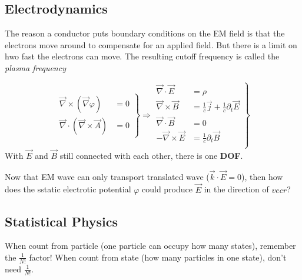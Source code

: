\subsection{Electrodynamics}

The reason a conductor puts boundary conditions on the EM field is that the
electrons move around to compensate for an applied field. But there is a
limit on hwo fast the electrons can move. The resulting cutoff frequency is
called the \textit{plasma frequency}
\begin{description}[style=nextline]
    \item [Maxwell Eqn] 
	\begin{equation}
	    \left.
	    \begin{aligned}
		\overrightarrow{\nabla} \times (\overrightarrow{\nabla} \varphi) &= 0 \\
		\overrightarrow{\nabla} \cdot (\overrightarrow{\nabla} \times \overrightarrow{A}) &= 0
	    \end{aligned}
	    \right\} 
	    \Rightarrow 
	    \left.
	    \begin{aligned}
		\overrightarrow{\nabla} \cdot \overrightarrow{E} &= \rho \\
		\overrightarrow{\nabla} \times \overrightarrow{B} &=
		\frac{1}{c} \overrightarrow{j} + \frac{1}{c}\partial_{t}\overrightarrow{E}   \\
		\overrightarrow{\nabla} \cdot \overrightarrow{B} &= 0	\\
		-\overrightarrow{\nabla} \times \overrightarrow{E} &=
		\frac{1}{c} \partial_{t}\overrightarrow{B}   \\
	    \end{aligned}
	    \right\}	
	\end{equation}
	With $\overrightarrow{E}$ and $\overrightarrow{B}$ still connected
	with each other, there is one \textbf{DOF}.
\end{description}

Now that EM wave can only transport translated wave ($\vec{k}\cdot\vec{E} =0$), then
how does the sstatic electrotic potential $\varphi$ could produce $\vec{E}$ in
the direction of $vec{r}$?


\subsection{Statistical Physics}
\begin{description}[style=nextline]
    \item [Partisian func] When count from particle (one particle can occupy
	how many states), remember the $\frac{1}{N!}$ factor! When count from
	state (how many particles in one state), don't need $\frac{1}{N!}$.
\end{description}

